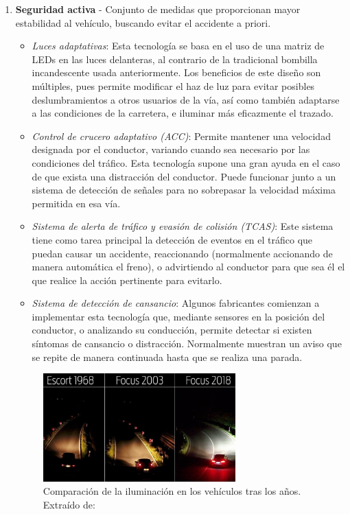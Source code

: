 \begin{enumerate}
    \item \textbf{Seguridad activa} - Conjunto de medidas que proporcionan mayor estabilidad al vehículo, buscando evitar el accidente a priori.
    \begin{itemize}
        \item \textit{Luces adaptativas}: Esta tecnología se basa en el uso de una matriz de LEDs en las luces delanteras, al contrario de la tradicional bombilla incandescente usada anteriormente. Los beneficios de este diseño son múltiples, pues permite modificar el haz de luz para evitar posibles deslumbramientos a otros usuarios de la vía, así como también adaptarse a las condiciones de la carretera, e iluminar más eficazmente el trazado.
     
        \item \textit{Control de crucero adaptativo (ACC)}: Permite mantener una velocidad designada por el conductor, variando cuando sea necesario por las condiciones del tráfico. Esta tecnología supone una gran ayuda en el caso de que exista una distracción del conductor. Puede funcionar junto a un sistema de detección de señales para no sobrepasar la velocidad máxima permitida en esa vía.
    
        \item \textit{Sistema de alerta de tráfico y evasión de colisión (TCAS)}: Este sistema tiene como tarea principal la detección de eventos en el tráfico que puedan causar un accidente, reaccionando (normalmente accionando de manera automática el freno), o advirtiendo al conductor para que sea él el que realice la acción pertinente para evitarlo.

        \item \textit{Sistema de detección de cansancio}: Algunos fabricantes \cite{volkswagen} comienzan a implementar esta tecnología que, mediante sensores en la posición del conductor, o analizando su conducción, permite detectar si existen síntomas de cansancio o distracción. Normalmente muestran un aviso que se repite de manera continuada hasta que se realiza una parada. 
\end{itemize}

\begin{figure}[h]
    \centering
    \includegraphics[width=0.7\textwidth]{imagenes/adaptive_lights.png}
    \caption{Comparación de la iluminación en los vehículos tras los años. Extraído de: \cite{luces_adaptativas}}
\end{figure}



\end{enumerate}
